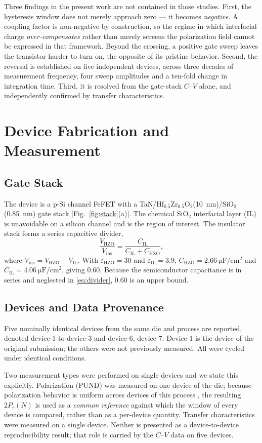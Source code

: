 \documentclass[journal]{IEEEtran}
\newcommand{\rev}[1]{{\color{blue}#1}}      %
\newcommand{\hzo}{Hf$_{0.5}$Zr$_{0.5}$O$_2$}
\newcommand{\Prem}{P_r}
\newcommand{\Cil}{C_{\mathrm{IL}}}
\newcommand{\Cfe}{C_{\mathrm{HZO}}}
\newcommand{\uFcm}{\micro\farad\per\centi\meter\squared}
\begin{document}
\rev{Three findings in the present work are not contained in those
studies. First, the hysteresis window does not merely approach zero --- it
becomes \emph{negative}. A coupling factor is non-negative by
construction, so the regime in which interfacial charge
\emph{over-compensates} rather than merely screens the polarization
field cannot be expressed in that framework. Beyond the crossing, a
positive gate sweep leaves the transistor harder to turn on, the
opposite of its pristine behavior. Second, the reversal is established
on five independent devices, across three decades of measurement
frequency, four sweep amplitudes and a ten-fold change in integration
time. Third, it is resolved from the gate-stack $C$--$V$ alone, and
independently confirmed by transfer characteristics.}

\section{Device Fabrication and Measurement}

\subsection{Gate Stack}
The device is a p-Si channel FeFET with a
TaN/\hzo{}(\SI{10}{\nano\meter})/SiO$_2$(\SI{0.85}{\nano\meter}) gate
stack [Fig.~\ref{fig:stack}(a)]. The chemical SiO$_2$ interfacial layer
(IL) is unavoidable on a silicon channel and is the region of interest.
The insulator stack forms a series capacitive divider,
\begin{equation}
\frac{V_{\mathrm{HZO}}}{V_{\mathrm{ins}}} = \frac{\Cil}{\Cil+\Cfe},
\label{eq:divider}
\end{equation}
where $V_{\mathrm{ins}}=V_{\mathrm{HZO}}+V_{\mathrm{IL}}$. With
$\varepsilon_{\mathrm{HZO}}=30$ and $\varepsilon_{\mathrm{IL}}=3.9$,
$\Cfe=\SI{2.66}{\uFcm}$ and $\Cil=\SI{4.06}{\uFcm}$, giving 0.60.
Because the semiconductor capacitance is in series and neglected in
\eqref{eq:divider}, 0.60 is an upper bound.

\rev{\subsection{Devices and Data Provenance}
Five nominally identical devices from the same die and process are
reported, denoted device-1 to device-3 and device-6, device-7. Device-1
is the device of the original submission; the others were not previously
measured. All were cycled under identical conditions.

Two measurement types were performed on single devices and we state this
explicitly. Polarization (PUND) was measured on one device of the die;
because polarization behavior is uniform across devices of this process
\cite{ACSAMI,ACSAELM}, the resulting $2\Prem(N)$ is used as a
\emph{common reference} against which the window of every device is
compared, rather than as a per-device quantity. Transfer characteristics
were measured on a single device. Neither is presented as a
device-to-device reproducibility result; that role is carried by the
$C$--$V$ data on five devices.}
\end{document}
